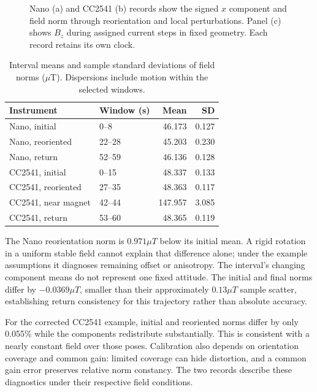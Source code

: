 \begin{figure}[t]
\centering

\caption{Nano (a) and CC2541 (b) records show the signed $x$ component and field norm through reorientation and local perturbations. Panel (c) shows $B_z$ during assigned current steps in fixed geometry. Each record retains its own clock.}
\label{fig:mag-examples}
\end{figure}

\begin{table}[t]
\caption{Interval means and sample standard deviations of field norms ($\mu$T). Dispersions include motion within the selected windows.}
\label{tab:mag-norms}
\centering\small
\begin{tabular}{@{}llrr@{}}
\toprule
Instrument & Window (s) & Mean & SD\\
\midrule
Nano, initial & 0--8 & 46.173 & 0.127\\
Nano, reoriented & 22--28 & 45.203 & 0.230\\
Nano, return & 52--59 & 46.136 & 0.128\\
CC2541, initial & 0--15 & 48.337 & 0.133\\
CC2541, reoriented & 27--35 & 48.363 & 0.117\\
CC2541, near magnet & 42--44 & 147.957 & 3.085\\
CC2541, return & 53--60 & 48.365 & 0.119\\
\bottomrule
\end{tabular}
\end{table}

The Nano reorientation norm is $0.971\unit{\mu T}$ below its initial mean. A rigid rotation in a uniform stable field cannot explain that difference alone; under the example assumptions it diagnoses remaining offset or anisotropy. The interval's changing component means do not represent one fixed attitude. The initial and final norms differ by $-0.0369\unit{\mu T}$, smaller than their approximately $0.13\unit{\mu T}$ sample scatter, establishing return consistency for this trajectory rather than absolute accuracy.

For the corrected CC2541 example, initial and reoriented norms differ by only 0.055\% while the components redistribute substantially. This is consistent with a nearly constant field over those poses. Calibration also depends on orientation coverage and common gain: limited coverage can hide distortion, and a common gain error preserves relative norm constancy. The two records describe these diagnostics under their respective field conditions.

